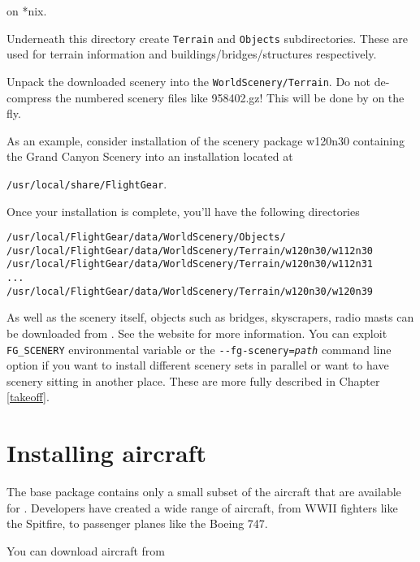 \noindent on *nix.

Underneath this directory create \texttt{Terrain} and \texttt{Objects} subdirectories. These are used for terrain information and buildings/bridges/structures respectively.

Unpack the downloaded scenery into the \texttt{WorldScenery/Terrain}. Do not de-compress the numbered
scenery files like 958402.gz! This will be done by \FlightGear{} on the fly. 

As an example, consider installation of the scenery package w120n30 containing the Grand
Canyon Scenery into an installation located at 

\texttt{/usr/local/share/FlightGear}.

Once your installation is complete, you'll have the following directories
\medskip

\begin{verbatim}
/usr/local/FlightGear/data/WorldScenery/Objects/
/usr/local/FlightGear/data/WorldScenery/Terrain/w120n30/w112n30
/usr/local/FlightGear/data/WorldScenery/Terrain/w120n30/w112n31
...
/usr/local/FlightGear/data/WorldScenery/Terrain/w120n30/w120n39
\end{verbatim}
\medskip

As well as the scenery itself, objects such as bridges, skyscrapers, radio masts can be downloaded
from . See the website for more information.
\medskip
You can exploit \texttt{FG\_SCENERY} environmental variable or the \texttt{-$ $-fg-scenery={\it path}} command line option if you want to install different scenery sets in parallel or want to have scenery sitting in another place. These are more fully described in Chapter \ref{takeoff}.

\section{Installing aircraft}

The base \FlightGear{} package contains only a small subset of the aircraft that are available for \FlightGear{}. 
Developers have created a wide range of aircraft, from WWII fighters like the Spitfire, to passenger planes like the Boeing 747.

You can download aircraft from 


